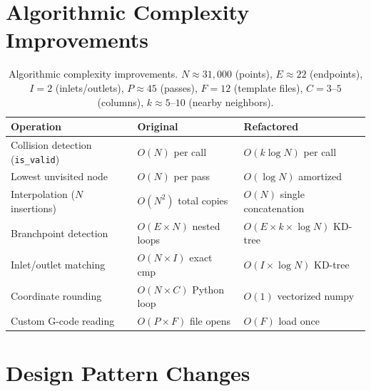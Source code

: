 \documentclass[11pt,letterpaper]{article}
\newcommand{\code}[1]{\texttt{#1}}
\begin{document}
\section{Algorithmic Complexity Improvements}

\begin{table}[h]
\centering
\small
\begin{tabularx}{\textwidth}{L{3.5cm} X X}
\toprule
\textbf{Operation} & \textbf{Original} & \textbf{Refactored} \\
\midrule
Collision detection (\code{is\_valid})    & $O(N)$ per call            & $O(k \log N)$ per call \\
Lowest unvisited node                    & $O(N)$ per pass            & $O(\log N)$ amortized \\
Interpolation ($N$ insertions)           & $O(N^2)$ total copies      & $O(N)$ single concatenation \\
Branchpoint detection                    & $O(E \times N)$ nested loops & $O(E \times k \times \log N)$ KD-tree \\
Inlet/outlet matching                    & $O(N \times I)$ exact cmp   & $O(I \times \log N)$ KD-tree \\
Coordinate rounding                      & $O(N \times C)$ Python loop & $O(1)$ vectorized numpy \\
Custom G-code reading                    & $O(P \times F)$ file opens  & $O(F)$ load once \\
\bottomrule
\end{tabularx}
\caption{Algorithmic complexity improvements. $N \approx 31{,}000$ (points), $E \approx 22$ (endpoints), $I = 2$ (inlets/outlets), $P \approx 45$ (passes), $F = 12$ (template files), $C = 3$--$5$ (columns), $k \approx 5$--$10$ (nearby neighbors).}
\end{table}

\section{Design Pattern Changes}
\end{document}
